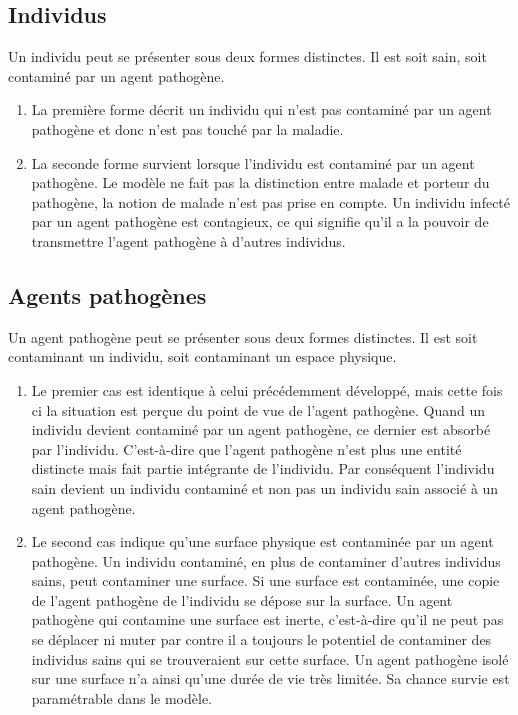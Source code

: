 \newpage

\subsection{Individus}

Un individu peut se présenter sous deux formes distinctes. Il est soit sain, soit contaminé par un agent pathogène.\\

\begin{enumerate}
	\item La première forme décrit un individu qui n'est pas contaminé par un agent pathogène et donc n'est pas touché par la maladie.
	\item La seconde forme survient lorsque l'individu est contaminé par un agent pathogène. Le modèle ne fait pas la distinction entre malade et porteur du pathogène, la notion de malade n'est pas prise en compte. Un individu infecté par un agent pathogène est contagieux, ce qui signifie qu'il a la pouvoir de transmettre l'agent pathogène à d'autres individus.
\end{enumerate}

\subsection{Agents pathogènes}

Un agent pathogène peut se présenter sous deux formes distinctes. Il est soit contaminant un individu, soit contaminant un espace physique.

\begin{enumerate}
\item Le premier cas est identique à celui précédemment développé, mais cette fois ci la situation est perçue du point de vue de l'agent pathogène. Quand un individu devient contaminé par un agent pathogène, ce dernier est absorbé par l'individu. C'est-à-dire que l'agent pathogène n'est plus une entité distincte mais fait partie intégrante de l'individu. Par conséquent l'individu sain devient un individu contaminé et non pas un individu sain associé à un agent pathogène.
\item Le second cas indique qu'une surface physique est contaminée par un agent pathogène. Un individu contaminé, en plus de contaminer d'autres individus sains, peut contaminer une surface. Si une surface est contaminée, une copie de l'agent pathogène de l'individu se dépose sur la surface. Un agent pathogène qui contamine une surface est inerte, c'est-à-dire qu'il ne peut pas se déplacer ni muter par contre il a toujours le potentiel de contaminer des individus sains qui se trouveraient sur cette surface. Un agent pathogène isolé sur une surface n'a ainsi qu'une durée de vie très limitée. Sa chance survie est paramétrable dans le modèle.
\end{enumerate}

